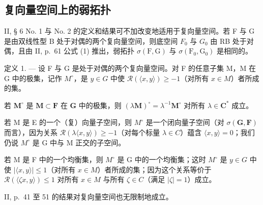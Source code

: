 \subsection{复向量空间上的弱拓扑}

II, § 6 No. 1 与 No. 2 的定义和结果可不加改变地适用于复向量空间。若 F 与 G 是由双线性型 B 处于对偶的两个复向量空间，则底空间 \(F_{0}\) 与 \(G_{0}\) 由 RB 处于对偶，且由 II, p.~61 公式 (1) 推出，弱拓扑 \(\sigma(\mathrm{F},\mathrm{G})\) 与 \(\sigma(\mathrm{F}_{0},\mathrm{G}_{0})\) 是相同的。

定义 1. --- 设 F 与 G 是处于对偶的两个复向量空间。对 F 的任意子集 M，M 在 G 中的极集，记作 \(M^{\circ}\)，是 \(y \in G\) 中使 \(\mathcal{R}(\langle x, y \rangle) \geqslant -1\)（对所有 \(x \in M\)）者所成的集。

若 \(\mathbf{M}^{\circ}\) 是 \(\mathbf{M} \subset \mathbf{F}\) 在 \(\mathbf{G}\) 中的极集，则 \((\lambda \mathbf{M})^{\circ} = \lambda^{-1}\mathbf{M}^{\circ}\) 对所有 \(\lambda \in \mathbf{C}^{*}\) 成立。

若 M 是 E 的一个（复）向量子空间，则 \(M^{\circ}\) 是一个闭向量子空间（对 \(\sigma(\mathbf{G},\mathbf{F})\) 而言），因为关系 \(\mathcal{R}(\lambda\langle x,y\rangle)\geqslant-1\)（对每个标量 \(\lambda\in C\)）蕴含 \(\langle x,y\rangle=0\)；我们仍说 \(M^{\circ}\) 是 G 中与 M 正交的子空间。

若 M 是 F 中的一个均衡集，则 \(M^{\circ}\) 是 G 中的一个均衡集；这时 \(M^{\circ}\) 是 \(y \in G\) 中使 \(\left|\langle x, y \rangle\right| \leqslant 1\)（对所有 \(x \in M\)）者所成的集；因为这个关系等价于 \(\mathcal{R}(\langle \zeta x, y \rangle) \leqslant 1\) 对所有 \(x \in M\) 与所有 \(\zeta \in C\)（满足 \(|\zeta| = 1\)）成立。

II, p.~41 至 51 的结果对复向量空间也无限制地成立。

